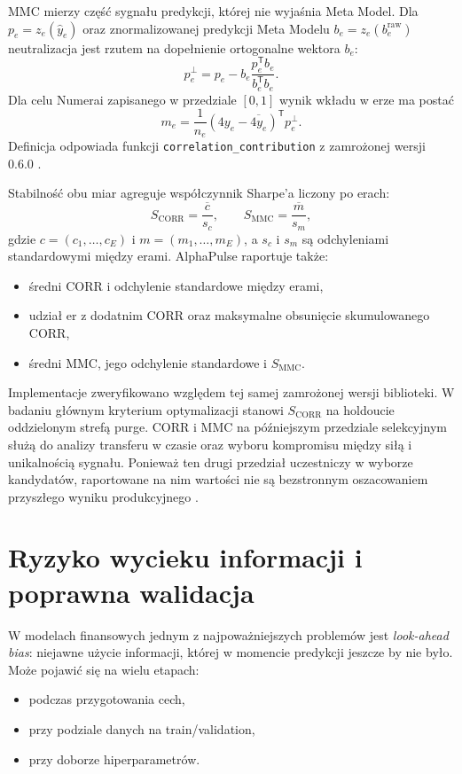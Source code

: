\documentclass[12pt,a4paper]{report}
\newcommand{\sourcecite}[1]{\autocite{#1}}
\begin{document}
MMC mierzy część sygnału predykcji, której nie wyjaśnia Meta Model. Dla
$p_e=z_e(\hat{y}_e)$ oraz znormalizowanej predykcji Meta Modelu
$b_e=z_e(b_e^{\mathrm{raw}})$ neutralizacja jest rzutem na dopełnienie ortogonalne
wektora $b_e$:
\begin{equation}
p_e^{\perp}=p_e-b_e\frac{p_e^{\mathsf T}b_e}{b_e^{\mathsf T}b_e}.
\label{eq:mmc-neutralization}
\end{equation}
Dla celu Numerai zapisanego w przedziale $[0,1]$ wynik wkładu w erze ma postać
\begin{equation}
m_e=\frac{1}{n_e}\left(4y_e-\overline{4y_e}\right)^{\mathsf T}p_e^{\perp}.
\label{eq:mmc-era}
\end{equation}
Definicja odpowiada funkcji \texttt{correlation\_contribution} z zamrożonej wersji
 0.6.0 \sourcecite{numerai-mmc,numerai-tools}.

Stabilność obu miar agreguje współczynnik Sharpe'a liczony po erach:
\begin{equation}
S_{\mathrm{CORR}}=\frac{\overline{c}}{s_c},
\qquad
S_{\mathrm{MMC}}=\frac{\overline{m}}{s_m},
\label{eq:corr-sharpe}
\end{equation}
gdzie $c=(c_1,\ldots,c_E)$ i $m=(m_1,\ldots,m_E)$, a $s_c$ i $s_m$ są
odchyleniami standardowymi między erami. AlphaPulse raportuje także:
\begin{itemize}\item średni CORR i odchylenie standardowe między erami,
\item udział er z dodatnim CORR oraz maksymalne obsunięcie skumulowanego CORR,
\item średni MMC, jego odchylenie standardowe i $S_{\mathrm{MMC}}$.\end{itemize}

Implementacje zweryfikowano względem tej samej zamrożonej wersji biblioteki. W badaniu
głównym kryterium optymalizacji stanowi
$S_{\mathrm{CORR}}$ na holdoucie oddzielonym strefą purge. CORR i MMC na późniejszym
przedziale selekcyjnym służą do analizy transferu w czasie oraz wyboru kompromisu
między siłą i unikalnością sygnału. Ponieważ ten drugi przedział uczestniczy w wyborze
kandydatów, raportowane na nim wartości nie są bezstronnym oszacowaniem przyszłego
wyniku produkcyjnego \sourcecite{cawley-talbot,varma-simon}.

\section{Ryzyko wycieku informacji i poprawna walidacja}
W modelach finansowych jednym z najpoważniejszych problemów jest
\textit{look-ahead bias}: niejawne użycie informacji, której w momencie predykcji
jeszcze by nie było. Może pojawić się na wielu etapach:
\begin{itemize}\item podczas przygotowania cech,
\item przy podziale danych na train/validation,
\item przy doborze hiperparametrów.\end{itemize}
\end{document}
